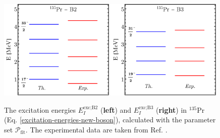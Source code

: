 \begin{figure}
    \centering
    \includegraphics[width=0.49\textwidth]{Chapters/Figures/135Pr-New-Boson-Band2-Energies.pdf}
    \includegraphics[width=0.49\textwidth]{Chapters/Figures/135Pr-New-Boson-Band3-Energies.pdf}
    \caption{The excitation energies $E_I^\text{exc;B2}$ (\textbf{left}) and $E_I^\text{exc;B3}$ (\textbf{right}) in $^{135}$Pr (Eq. \ref{excitation-energies-new-boson}), calculated with the parameter set $\mathcal{P}_\text{fit}$. The experimental data are taken from Ref. \cite{sensharma2019two}.}
    \label{135pr-new-boson-band23}
\end{figure}

